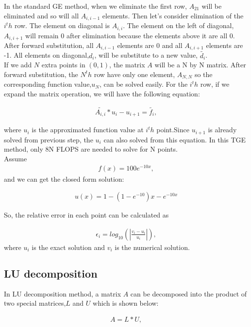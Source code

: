 \documentclass{article}
\begin{document}
In the standard GE method, when we eliminate the first row, $A_{21}$ will be eliminated and so will all $A_{i,i-1}$ elements. Then let's consider elimination of the  $i^th$ row. The element on diagonal is $A_{i,i}$. The element on the left of diagonal, $A_{i,i+1}$ will remain 0 after elimination because the elements above it are all 0. After forward substitution, all $A_{i,i-1}$ elements are 0 and all $A_{i,i+1}$ elements are -1. All elements on diagonal,$d_i$, will be substitute to a new value, $\tilde{{d_i}}$. \\
If we add $N$ extra points in $(0,1)$, the matrix $A$ will be a N by N matrix. After forward substitution, the $N^th$ row have only one element, $A_{N,N}$ so the corresponding function value,$u_{N}$, can be solved easily. For the $i^th$ row, if we expand the matrix operation, we will have the following equation:

\begin{align}
\tilde{{A_{i,i}}}*u_i-u_{i+1} = \tilde{f_i},
\end{align}

where $u_i$ is the approximated function value at $i^th$ point.Since $u_{i+1}$ is already solved from previous step, the $u_i$ can also solved from this equation. In this TGE method, only 8N FLOPS are needed to solve for N points.\\
Assume
\begin{align}
f(x) = 100e^{-10x},
\end{align}
and we can get the closed form solution:

\begin{align}
u(x) = 1-(1-e^{-10})x-e^{-10x}
\end{align}

So, the relative error in each point can be calculated as 

\begin{align}
   \epsilon_i=log_{10}\left(\left|\frac{v_i-u_i}
   {u_i}\right|\right),
\end{align}
where $u_i$ is the exact solution and $v_i$ is the numerical solution.

\subsection{LU decomposition}
In LU decomposition method, a matrix $A$ can be decomposed into the product of two special matrices,$L$ and $U$ which is shown below:

\begin{align}
A = L*U,
\end{align}
\end{document}
